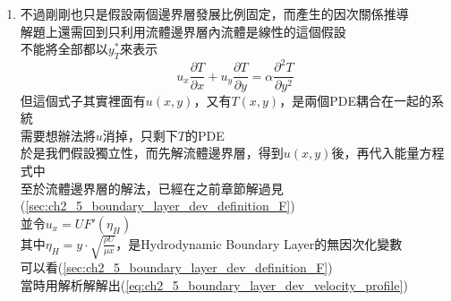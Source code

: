 \documentclass[../main.tex]{subfiles}
\begin{document}
\begin{itemize}
\begin{enumerate}
    衍生，如果將$\frac{\delta_T}{L}$表示出來:
    \begin{align}
      & \frac{\delta_T}{L} = \frac{\delta_T}{\delta} \cdot \frac{\delta}{L} \nonumber\\
      \Rightarrow & \boxed{\frac{\delta_T}{L} = a\text{Re}_L^{-\frac{1}{2}} \text{Pr}^{-\frac{1}{3}}}
    \end{align}
    然後把熱傳係數相關的Nusselt Number也表示出來(見\ref{eq:graetz_nusselt_number})
    \begin{align}
      & \text{Nu}_L = \frac{hL}{k}, \quad h = \frac{k}{\delta_T} \nonumber\\
      \Rightarrow & \text{Nu}_L = \frac{k}{\delta_T}\cdot \frac{L}{k} = \frac{L}{\delta_T} \nonumber\\
      \Rightarrow & \boxed{\text{Nu}_L = a^{-1}\text{Re}_L^{\frac{1}{2}} \text{Pr}^{\frac{1}{3}}}
    \end{align}
    而這個的數值解則是$a^{-1} = 0.664$，與Blasius解法相同
    \begin{equation}
      \text{Nu}_L = 0.664 \text{Re}_L^{\frac{1}{2}} \text{Pr}^{\frac{1}{3}} \label{eq:graetz_nusselt_number_final}
    \end{equation}
    \item 不過剛剛也只是假設兩個邊界層發展比例固定，而產生的因次關係推導\\
    解題上還需回到只利用流體邊界層內流體是線性的這個假設\\
    不能將全部都以$y_T^\ast$來表示
    \begin{equation}
      u_x \frac{\partial T}{\partial x} + u_y \frac{\partial T}{\partial y} = \alpha \frac{\partial^2 T}{\partial y^2}
    \end{equation}
    但這個式子其實裡面有$u(x,y)$，又有$T(x,y)$，是兩個PDE耦合在一起的系統\\
    需要想辦法將$u$消掉，只剩下$T$的PDE\\
    於是我們假設獨立性，而先解流體邊界層，得到$u(x,y)$後，再代入能量方程式中\\
    至於流體邊界層的解法，已經在之前章節解過見(\ref{sec:ch2_5_boundary_layer_dev_definition_F})\\
    並令$u_x = U F'(\eta_H)$\\
    其中$\eta_H = y\cdot \sqrt{\frac{\rho U}{\mu x}}$，是Hydrodynamic Boundary Layer的無因次化變數\\
    可以看(\ref{sec:ch2_5_boundary_layer_dev_definition_F})\\
    當時用解析解解出(\ref{eq:ch2_5_boundary_layer_dev_velocity_profile})

\end{enumerate}
\end{itemize}
\end{document}
